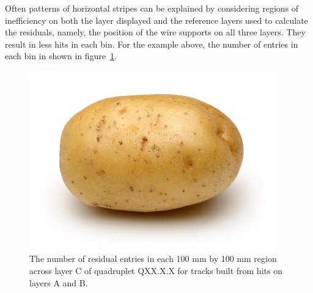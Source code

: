 
Often patterns of horizontal stripes can be explained by considering regions of inefficiency on both the layer displayed and the reference layers used to calculate the residuals, namely, the position of the wire supports on all three layers. They result in less hits in each bin. For the example above, the number of entries in each bin in shown in figure~\ref{fig:num_entries_th2}.

\begin{figure}
    \centering
    \includegraphics[width = 0.95\textwidth]{figures/potato.jpg}
    \caption{The number of residual entries in each 100 mm by 100 mm region across layer C of quadruplet QXX.X.X for tracks built from hits on layers A and B.}
    \label{fig:num_entries_th2}
\end{figure}






